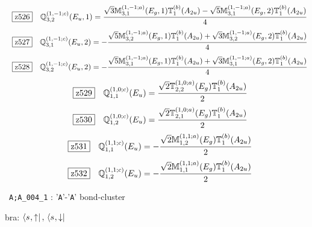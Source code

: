 \documentclass[fleqn,10pt,landscape]{jsarticle}
\begin{document}
\begin{dmath*}
\hspace*{3mm}\fbox{z526}\quad \mathbb{Q}_{3,2}^{(1,-1;c)}(E_{u},1)=\frac{\sqrt{3} \mathbb{M}_{3,1}^{(1,-1;a)}(E_{g},1) \mathbb{T}_{1}^{(b)}(A_{2u}) - \sqrt{5} \mathbb{M}_{3,1}^{(1,-1;a)}(E_{g},2) \mathbb{T}_{1}^{(b)}(A_{2u})}{4}
\end{dmath*}
\begin{dmath*}
\hspace*{3mm}\fbox{z527}\quad \mathbb{Q}_{3,1}^{(1,-1;c)}(E_{u},2)=- \frac{\sqrt{5} \mathbb{M}_{3,2}^{(1,-1;a)}(E_{g},1) \mathbb{T}_{1}^{(b)}(A_{2u}) + \sqrt{3} \mathbb{M}_{3,2}^{(1,-1;a)}(E_{g},2) \mathbb{T}_{1}^{(b)}(A_{2u})}{4}
\end{dmath*}
\begin{dmath*}
\hspace*{3mm}\fbox{z528}\quad \mathbb{Q}_{3,2}^{(1,-1;c)}(E_{u},2)=- \frac{\sqrt{5} \mathbb{M}_{3,1}^{(1,-1;a)}(E_{g},1) \mathbb{T}_{1}^{(b)}(A_{2u}) + \sqrt{3} \mathbb{M}_{3,1}^{(1,-1;a)}(E_{g},2) \mathbb{T}_{1}^{(b)}(A_{2u})}{4}
\end{dmath*}
\begin{dmath*}
\hspace*{3mm}\fbox{z529}\quad \mathbb{Q}_{1,1}^{(1,0;c)}(E_{u})=\frac{\sqrt{2} \mathbb{T}_{2,2}^{(1,0;a)}(E_{g}) \mathbb{T}_{1}^{(b)}(A_{2u})}{2}
\end{dmath*}
\begin{dmath*}
\hspace*{3mm}\fbox{z530}\quad \mathbb{Q}_{1,2}^{(1,0;c)}(E_{u})=\frac{\sqrt{2} \mathbb{T}_{2,1}^{(1,0;a)}(E_{g}) \mathbb{T}_{1}^{(b)}(A_{2u})}{2}
\end{dmath*}
\begin{dmath*}
\hspace*{3mm}\fbox{z531}\quad \mathbb{Q}_{1,1}^{(1,1;c)}(E_{u})=- \frac{\sqrt{2} \mathbb{M}_{1,2}^{(1,1;a)}(E_{g}) \mathbb{T}_{1}^{(b)}(A_{2u})}{2}
\end{dmath*}
\begin{dmath*}
\hspace*{3mm}\fbox{z532}\quad \mathbb{Q}_{1,2}^{(1,1;c)}(E_{u})=- \frac{\sqrt{2} \mathbb{M}_{1,1}^{(1,1;a)}(E_{g}) \mathbb{T}_{1}^{(b)}(A_{2u})}{2}
\end{dmath*}
\vspace{5mm}

\noindent\textbullet\, \texttt{A;A_004_1} : '\texttt{A}'-'\texttt{A}' bond-cluster

\noindent\quad * bra: $\bra{s_{},\uparrow},\, \bra{s_{},\downarrow}$
\end{document}
